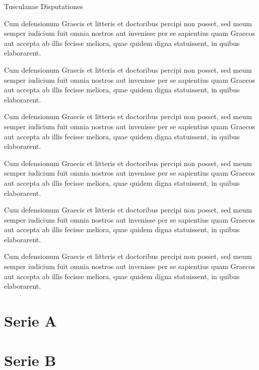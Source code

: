 \documentclass[11pt,b5paper,twoside]{book}
\begin{document}
\beginnumbering
\pstart
\begin{center}
    {\Large {}Tusculanae Disputationes}
\end{center}
\pend
\bigskip

\setcounter{pstart}{1}
\numberpstarttrue

\pstart{}%
    Cum defensionum  Graecis et litteris et doctoribus percipi non posset, sed meum semper iudicium fuit omnia nostros aut invenisse per se sapientius quam Graecos aut accepta ab illis fecisse meliora, quae quidem digna statuissent, in quibus elaborarent.
\pend

\pstart%
%
Cum defensionum  Graecis et litteris et doctoribus percipi non posset, sed meum semper iudicium fuit omnia nostros aut invenisse per se sapientius quam Graecos aut accepta ab illis fecisse meliora, quae quidem digna statuissent, in quibus elaborarent.
\pend

\endnumbering
\beginnumbering
\numberpstarttrue

\pstart%
Cum defensionum  Graecis et litteris et doctoribus percipi non posset, sed meum semper iudicium fuit omnia nostros aut invenisse per se sapientius quam Graecos aut accepta ab illis fecisse meliora, quae quidem digna statuissent, in quibus elaborarent.
\pend

\pstart%
Cum defensionum  Graecis et litteris et doctoribus percipi non posset, sed meum semper iudicium fuit omnia nostros aut invenisse per se sapientius quam Graecos aut accepta ab illis fecisse meliora, quae quidem digna statuissent, in quibus elaborarent.
\pend

\pstart%
Cum defensionum  Graecis et litteris et doctoribus percipi non posset, sed meum semper iudicium fuit omnia nostros aut invenisse per se sapientius quam Graecos aut accepta ab illis fecisse meliora, quae quidem digna statuissent, in quibus elaborarent.
\pend

\pstart{}
    Cum defensionum  Graecis et litteris et doctoribus percipi non posset, sed meum semper iudicium fuit omnia nostros aut invenisse per se sapientius quam Graecos aut accepta ab illis fecisse meliora, quae quidem digna statuissent, in quibus elaborarent.
\pend

\numberpstartfalse
\endnumbering

\newpage
{}
\newpage
\section{Serie A}
\section{Serie B}
\end{document}
